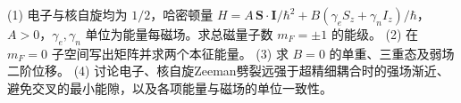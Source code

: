 (1) 电子与核自旋均为 \(1/2\)，哈密顿量 \(H=A\,\mathbf S\cdot\mathbf I/\hbar^2+B(\gamma_eS_z+\gamma_nI_z)/\hbar\)，\(A>0\)，\(\gamma_e,\gamma_n\) 单位为能量每磁场。求总磁量子数 \(m_F=\pm1\) 的能级。
(2) 在 \(m_F=0\) 子空间写出矩阵并求两个本征能量。
(3) 求 \(B=0\) 的单重、三重态及弱场二阶位移。
(4) 讨论电子、核自旋Zeeman劈裂远强于超精细耦合时的强场渐近、避免交叉的最小能隙，以及各项能量与磁场的单位一致性。
